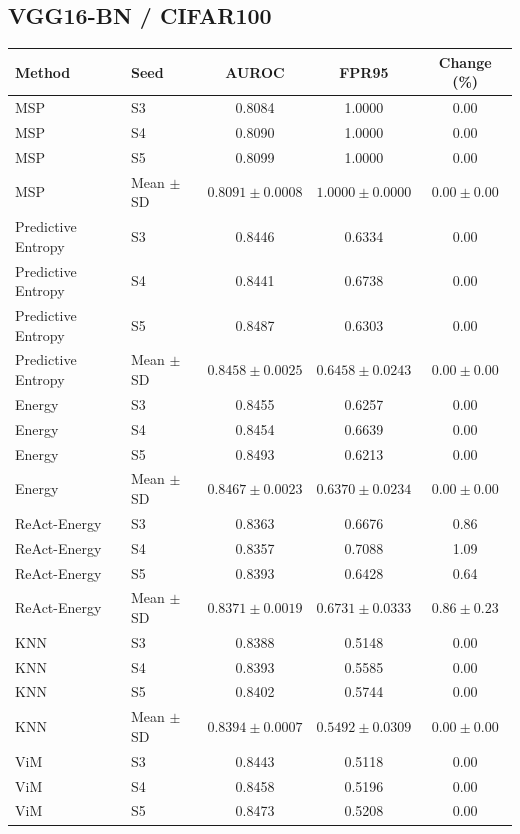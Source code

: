 \subsection*{VGG16-BN / CIFAR100}
\begingroup
\footnotesize
\setlength{\tabcolsep}{3pt}
\renewcommand{\arraystretch}{1.1}
\begin{longtable}{@{}llccc@{}}
\toprule
Method & Seed & AUROC & FPR95 & Change (\%) \\
\midrule
\endhead
\bottomrule
\endlastfoot
MSP & S3 & 0.8084 & 1.0000 & 0.00 \\
MSP & S4 & 0.8090 & 1.0000 & 0.00 \\
MSP & S5 & 0.8099 & 1.0000 & 0.00 \\
MSP & Mean $\pm$ SD & $0.8091 \pm 0.0008$ & $1.0000 \pm 0.0000$ & $0.00 \pm 0.00$ \\
Predictive Entropy & S3 & 0.8446 & 0.6334 & 0.00 \\
Predictive Entropy & S4 & 0.8441 & 0.6738 & 0.00 \\
Predictive Entropy & S5 & 0.8487 & 0.6303 & 0.00 \\
Predictive Entropy & Mean $\pm$ SD & $0.8458 \pm 0.0025$ & $0.6458 \pm 0.0243$ & $0.00 \pm 0.00$ \\
Energy & S3 & 0.8455 & 0.6257 & 0.00 \\
Energy & S4 & 0.8454 & 0.6639 & 0.00 \\
Energy & S5 & 0.8493 & 0.6213 & 0.00 \\
Energy & Mean $\pm$ SD & $0.8467 \pm 0.0023$ & $0.6370 \pm 0.0234$ & $0.00 \pm 0.00$ \\
ReAct-Energy & S3 & 0.8363 & 0.6676 & 0.86 \\
ReAct-Energy & S4 & 0.8357 & 0.7088 & 1.09 \\
ReAct-Energy & S5 & 0.8393 & 0.6428 & 0.64 \\
ReAct-Energy & Mean $\pm$ SD & $0.8371 \pm 0.0019$ & $0.6731 \pm 0.0333$ & $0.86 \pm 0.23$ \\
KNN & S3 & 0.8388 & 0.5148 & 0.00 \\
KNN & S4 & 0.8393 & 0.5585 & 0.00 \\
KNN & S5 & 0.8402 & 0.5744 & 0.00 \\
KNN & Mean $\pm$ SD & $0.8394 \pm 0.0007$ & $0.5492 \pm 0.0309$ & $0.00 \pm 0.00$ \\
ViM & S3 & 0.8443 & 0.5118 & 0.00 \\
ViM & S4 & 0.8458 & 0.5196 & 0.00 \\
ViM & S5 & 0.8473 & 0.5208 & 0.00 \\

\end{longtable}
